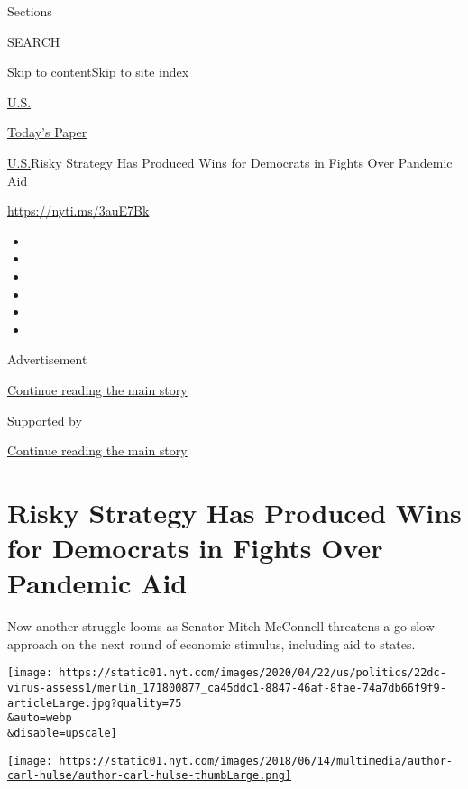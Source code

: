 Sections

SEARCH

\protect\hyperlink{site-content}{Skip to
content}\protect\hyperlink{site-index}{Skip to site index}

\href{https://www.nytimes.com/section/us}{U.S.}

\href{https://myaccount.nytimes.com/auth/login?response_type=cookie\&client_id=vi}{}

\href{https://www.nytimes.com/section/todayspaper}{Today's Paper}

\href{/section/us}{U.S.}\textbar{}Risky Strategy Has Produced Wins for
Democrats in Fights Over Pandemic Aid

\href{https://nyti.ms/3auE7Bk}{https://nyti.ms/3auE7Bk}

\begin{itemize}
\item
\item
\item
\item
\item
\item
\end{itemize}

Advertisement

\protect\hyperlink{after-top}{Continue reading the main story}

Supported by

\protect\hyperlink{after-sponsor}{Continue reading the main story}

\hypertarget{risky-strategy-has-produced-wins-for-democrats-in-fights-over-pandemic-aid}{%
\section{Risky Strategy Has Produced Wins for Democrats in Fights Over
Pandemic
Aid}\label{risky-strategy-has-produced-wins-for-democrats-in-fights-over-pandemic-aid}}

Now another struggle looms as Senator Mitch McConnell threatens a
go-slow approach on the next round of economic stimulus, including aid
to states.

\texttt{[image: https://static01.nyt.com/images/2020/04/22/us/politics/22dc-virus-assess1/merlin\_171800877\_ca45ddc1-8847-46af-8fae-74a7db66f9f9-articleLarge.jpg?quality=75\\\&auto=webp\\\&disable=upscale]}

\href{https://www.nytimes.com/by/carl-hulse}{\texttt{[image: https://static01.nyt.com/images/2018/06/14/multimedia/author-carl-hulse/author-carl-hulse-thumbLarge.png]}}

